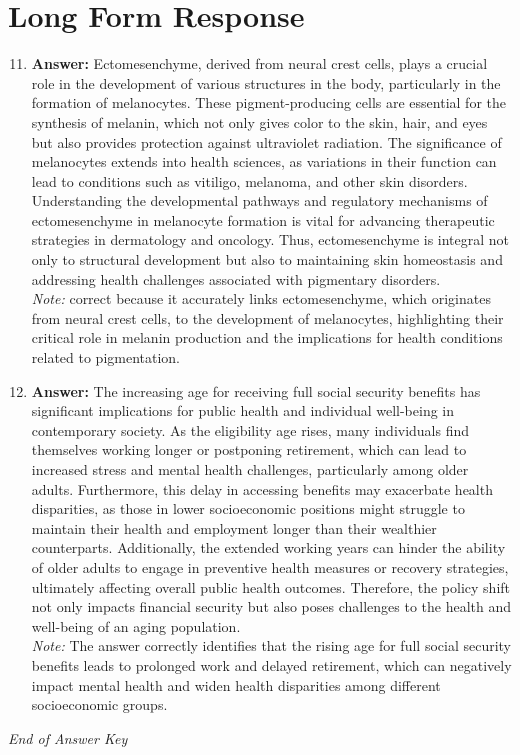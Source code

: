 \documentclass[12pt]{article}
\begin{document}
\section*{Long Form Response}
\begin{enumerate}[label=\arabic*.]
\setcounter{enumi}{10}
\item \textbf{Answer:} Ectomesenchyme, derived from neural crest cells, plays a crucial role in the development of various structures in the body, particularly in the formation of melanocytes. These pigment-producing cells are essential for the synthesis of melanin, which not only gives color to the skin, hair, and eyes but also provides protection against ultraviolet radiation. The significance of melanocytes extends into health sciences, as variations in their function can lead to conditions such as vitiligo, melanoma, and other skin disorders. Understanding the developmental pathways and regulatory mechanisms of ectomesenchyme in melanocyte formation is vital for advancing therapeutic strategies in dermatology and oncology. Thus, ectomesenchyme is integral not only to structural development but also to maintaining skin homeostasis and addressing health challenges associated with pigmentary disorders.
\\ \textit{Note:} correct because it accurately links ectomesenchyme, which originates from neural crest cells, to the development of melanocytes, highlighting their critical role in melanin production and the implications for health conditions related to pigmentation.
\item \textbf{Answer:} The increasing age for receiving full social security benefits has significant implications for public health and individual well-being in contemporary society. As the eligibility age rises, many individuals find themselves working longer or postponing retirement, which can lead to increased stress and mental health challenges, particularly among older adults. Furthermore, this delay in accessing benefits may exacerbate health disparities, as those in lower socioeconomic positions might struggle to maintain their health and employment longer than their wealthier counterparts. Additionally, the extended working years can hinder the ability of older adults to engage in preventive health measures or recovery strategies, ultimately affecting overall public health outcomes. Therefore, the policy shift not only impacts financial security but also poses challenges to the health and well-being of an aging population.
\\ \textit{Note:} The answer correctly identifies that the rising age for full social security benefits leads to prolonged work and delayed retirement, which can negatively impact mental health and widen health disparities among different socioeconomic groups.
\end{enumerate}

\vfill
\noindent\textit{End of Answer Key}
\end{document}
